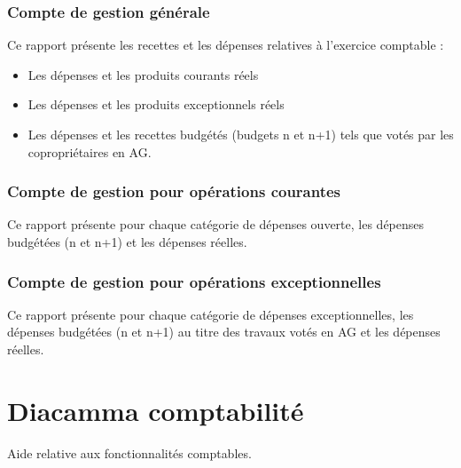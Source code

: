 \documentclass[a4paper,10pt,oneside,french]{sphinxmanual}
\begin{document}
\subsection{Compte de gestion générale}
\label{\detokenize{condominium/report:compte-de-gestion-generale}}
\sphinxAtStartPar
Ce rapport présente les recettes et les dépenses relatives à l’exercice comptable :
\begin{itemize}
\item {} 
\sphinxAtStartPar
Les dépenses et les produits courants réels

\item {} 
\sphinxAtStartPar
Les dépenses et les produits exceptionnels réels

\item {} 
\sphinxAtStartPar
Les dépenses et les recettes budgétés (budgets n et n+1) tels que votés par les copropriétaires en AG.

\end{itemize}


\subsection{Compte de gestion pour opérations courantes}
\label{\detokenize{condominium/report:compte-de-gestion-pour-operations-courantes}}
\sphinxAtStartPar
Ce rapport présente pour chaque catégorie de dépenses ouverte, les dépenses budgétées (n et n+1) et les dépenses
réelles.


\subsection{Compte de gestion pour opérations exceptionnelles}
\label{\detokenize{condominium/report:compte-de-gestion-pour-operations-exceptionnelles}}
\sphinxAtStartPar
Ce rapport présente pour chaque catégorie de dépenses exceptionnelles, les dépenses budgétées (n et n+1) au titre
des travaux votés en AG et les dépenses réelles.

\sphinxstepscope


\chapter{Diacamma comptabilité}
\label{\detokenize{accounting/index:diacamma-comptabilite}}\label{\detokenize{accounting/index::doc}}
\sphinxAtStartPar
Aide relative aux fonctionnalités comptables.

\sphinxstepscope
\end{document}
